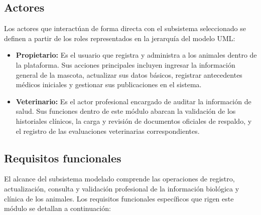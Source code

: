 \documentclass[journal,onecolumn]{IEEEtran}
\begin{document}
	\subsection{Actores}
	Los actores que interactúan de forma directa con el subsistema seleccionado se definen a partir de los roles representados en la jerarquía del modelo UML:
	\begin{itemize}[leftmargin=*]
		\item \textbf{Propietario:} Es el usuario que registra y administra a los animales dentro de la plataforma. Sus acciones principales incluyen ingresar la información general de la mascota, actualizar sus datos básicos, registrar antecedentes médicos iniciales y gestionar sus publicaciones en el sistema.
		\item \textbf{Veterinario:} Es el actor profesional encargado de auditar la información de salud. Sus funciones dentro de este módulo abarcan la validación de los historiales clínicos, la carga y revisión de documentos oficiales de respaldo, y el registro de las evaluaciones veterinarias correspondientes.
	\end{itemize}
	
	\subsection{Requisitos funcionales}
	El alcance del subsistema modelado comprende las operaciones de registro, actualización, consulta y validación profesional de la información biológica y clínica de los animales. Los requisitos funcionales específicos que rigen este módulo se detallan a continuación:
	
\end{document}
